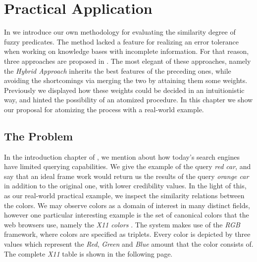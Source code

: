 \documentclass[egilmezThesis.tex]{subfiles}
\begin{document}
\chapter{Practical Application}
\label{chap:example}

In \cite{Sin12} we introduce our own methodology for evaluating the similarity degree of fuzzy predicates. The method lacked a feature for realizing an error tolerance when working on knowledge bases with incomplete information. For that reason, three approaches are proposed in \cite{Sin12} . The most elegant of these approaches, namely the \textit{Hybrid Approach} inherits the best features of the preceding ones, while avoiding the shortcomings via merging the two by attaining them some weights. Previously we displayed how these weights could be decided in an intuitionistic way, and hinted the possibility of an atomized procedure. In this chapter we show our proposal for atomizing the process with a real-world example.

\section{The Problem}
\label{problem}
In the introduction chapter of \cite{Sin12}, we mention about how today's search engines have limited querying capabilities. We give the example of the query \textit{red car}, and say that an ideal frame work would return us the results of the query \textit{orange car} in addition to the original one, with lower credibility values. In the light of this, as our real-world practical example, we inspect the similarity relations between the colors. We may observe colors as a domain of interest in many distinct fields, however one particular interesting example is the set of canonical colors that the web browsers use, namely the \textit{X11 colors} \cite{Wri08}. The system makes use of the \textit{RGB} framework, where colors are specified as triplets. Every color is depicted by three values which represent the \textit{Red}, \textit{Green} and \textit{Blue} amount that the color consists of. The complete \textit{X11} table is shown in the following page.
\end{document}
